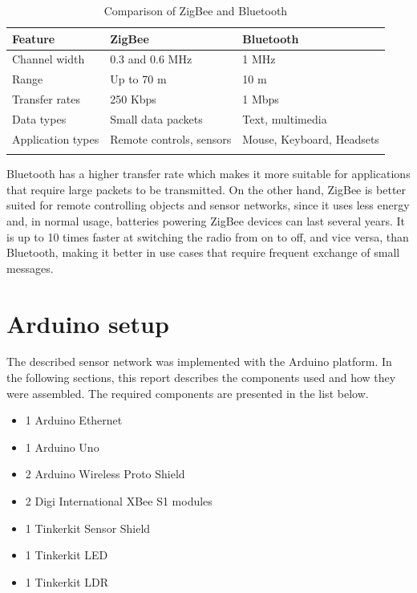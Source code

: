 \documentclass[conference, a4paper]{IEEEtran}
\begin{document}
\begin{table}[h]
\centering
\begin{tabular}{lll}
Feature                              & ZigBee                                 & Bluetooth                 \\ \hline
\rowcolor[HTML]{EFEFEF} 
{\color[HTML]{333333} Channel width} & {\color[HTML]{333333} 0.3 and 0.6 MHz} & 1 MHz                     \\
Range                                & Up to 70 m                             & 10 m                      \\
\rowcolor[HTML]{EFEFEF} 
Transfer rates                       & 250 Kbps                               & 1 Mbps                    \\
Data types                           & Small data packets                     & Text, multimedia          \\
\rowcolor[HTML]{EFEFEF} 
Application types                    & Remote controls, sensors               & Mouse, Keyboard, Headsets \\
                                     &                                        &                          
\end{tabular}
\caption{Comparison of ZigBee and Bluetooth \cite{1_engineersgarage.com}}
\label{table_zb}
\end{table}

Bluetooth has a higher transfer rate which makes it more suitable for applications that require large packets to be transmitted. On the other hand, ZigBee is better suited for remote controlling objects and sensor networks, since it uses less energy and, in normal usage, batteries powering ZigBee devices can last several years. It is up to 10 times faster at switching the radio from on to off, and vice versa, than Bluetooth, making it better in use cases that require frequent exchange of small messages.

\section{Arduino setup}
\label{ard_setup}

The described sensor network was implemented with the Arduino platform. In the following sections, this report describes the components used and how they were assembled. The required components are presented in the list below.

\begin{itemize}
  \item 1 Arduino Ethernet
  \item 1 Arduino Uno
  \item 2 Arduino Wireless Proto Shield
  \item 2 Digi International XBee S1 modules
  \item 1 Tinkerkit Sensor Shield
  \item 1 Tinkerkit LED
  \item 1 Tinkerkit LDR
\end{itemize}
\end{document}
